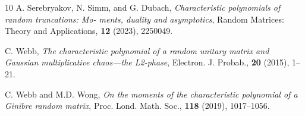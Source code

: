 \documentclass[11pt,a4paper]{article}
\numberwithin{equation}{section} %
\theoremstyle{plain}
\theoremstyle{definition}
\numberwithin{prop}{section}
\numberwithin{cor}{section}
\numberwithin{remark}{section}
\begin{document}
\begin{thebibliography}{10}
A. Serebryakov, N. Simm, and G. Dubach, \emph{Characteristic polynomials of random truncations: Mo-
ments, duality and asymptotics}, Random Matrices: Theory and Applications, \textbf{12} (2023),  2250049.

C. Webb, \emph{The characteristic polynomial of a random unitary matrix and Gaussian multiplicative chaos---the L2-phase}, Electron. J. Probab., \textbf{20} (2015), 1--21.

  C. Webb and M.D. Wong, \emph{On the moments of the characteristic polynomial of a
Ginibre random matrix}, Proc. Lond. Math. Soc., \textbf{118} (2019), 1017--1056.


   \end{thebibliography}
\end{document}
